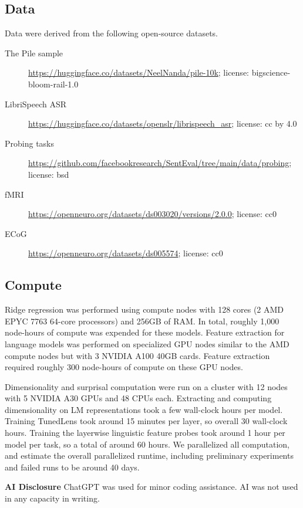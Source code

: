 \documentclass{article}
\theoremstyle{plain}
\theoremstyle{definition}
\theoremstyle{remark}
\newcommand{\mypar}[1]{\textbf{#1}\quad}
\begin{document}
\subsection{Data} Data were derived from the following open-source datasets.

\begin{description}
    \item[The Pile sample] \url{https://huggingface.co/datasets/NeelNanda/pile-10k}; license: bigscience-bloom-rail-1.0
    \item[LibriSpeech ASR] \url{https://huggingface.co/datasets/openslr/librispeech_asr}; license: cc by 4.0
    \item[Probing tasks \citep{conneau-etal-2018-cram}] \url{https://github.com/facebookresearch/SentEval/tree/main/data/probing}; license: bsd
    \item[fMRI \citep{LeBel_Wagner_Jain_Adhikari-Desai_Gupta_Morgenthal_Tang_Xu_Huth_2023}] \url{https://openneuro.org/datasets/ds003020/versions/2.0.0}; license: cc0
    \item[ECoG \citep{zada2025podcast}] \url{https://openneuro.org/datasets/ds005574}; license: cc0
\end{description}

\subsection{Compute}
Ridge regression was performed using compute nodes with 128 cores (2 AMD EPYC 7763 64-core processors) and 256GB of RAM. In total, roughly 1,000 node-hours of compute was expended for these models. Feature extraction for language models was performed on specialized GPU nodes similar to the AMD compute nodes but with 3 NVIDIA A100 40GB cards. Feature extraction required roughly 300 node-hours of compute on these GPU nodes. 

Dimensionality and surprisal computation were run on a cluster with 12 nodes with 5 NVIDIA A30 GPUs and 48 CPUs each. Extracting and computing dimensionality on LM representations took a few wall-clock hours per model. Training TunedLens took around 15 minutes per layer, so overall 30 wall-clock hours. Training the layerwise linguistic feature probes took around 1 hour per model per task, so a total of around 60 hours. We parallelized all computation, and estimate the overall parallelized runtime, including preliminary experiments and failed runs to be around 40 days.

\mypar{AI Disclosure} ChatGPT was used for minor coding assistance. AI was not used in any capacity in writing.
\end{document}
